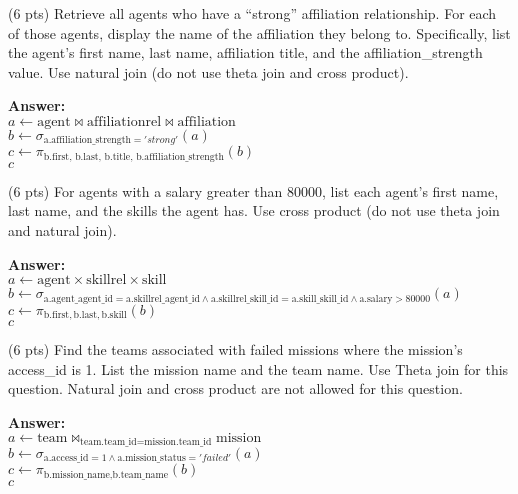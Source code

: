 \begin{questions}
\question (6 pts) Retrieve all agents who have a “strong” affiliation relationship. For each of those agents, display the name of the affiliation they belong to. Specifically, list the agent’s first name, last name, affiliation title, and the affiliation\_strength value. Use natural join (do not use theta join and cross product). 

\textbf{Answer:} \\
$a \leftarrow \text{agent} \bowtie \text{affiliationrel} \bowtie \text{affiliation}$\\
$b \leftarrow \sigma_{\text{a.affiliation\_strength} = 'strong'}(a)$\\
$c \leftarrow \pi_{\text{b.first, b.last, b.title, b.affiliation\_strength}}(b)$\\
$c$

\vspace{15 mm}
	
\question (6 pts) For agents with a salary greater than 80000, list each agent’s first name, last name, and the skills the agent has. Use cross product (do not use theta join and natural join).

\textbf{Answer:} \\
$a \leftarrow \text{agent} \times \text{skillrel} \times \text{skill}$\\
$b \leftarrow \sigma_{\text{a.agent\_agent\_id} = \text{a.skillrel\_agent\_id}
      \land \text{a.skillrel\_skill\_id} = \text{a.skill\_skill\_id}
      \land \text{a.salary} > 80000} (a)$\\
$c \leftarrow \pi_{\text{b.first}, \text{b.last}, \text{b.skill}}(b)$\\
$c$


\vspace{15 mm}

\question (6 pts) Find the teams associated with failed missions where the mission's access\_id is 1. List the mission name and the team name. Use Theta join for this question. Natural join and cross product are not allowed for this question. 

\textbf{Answer:} \\
$a \leftarrow \text{team} \bowtie_{\text{team.team\_id} = \text{mission.team\_id}} \text{mission}$\\
$b \leftarrow \sigma_{\text{a.access\_id} = 1 \land \text{a.mission\_status} = 'failed'}(a)$\\
$c \leftarrow \pi_{\text{b.mission\_name}, \text{b.team\_name}}(b)$\\
$c$




\end{questions}
